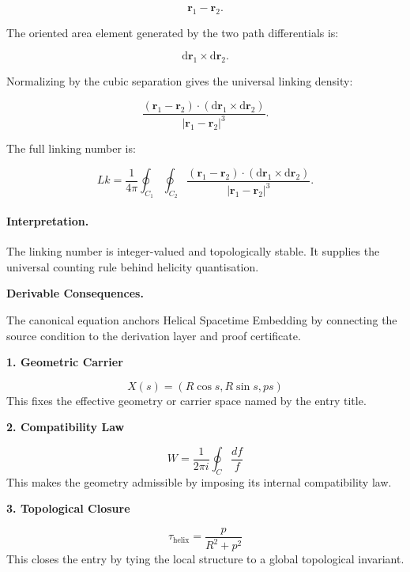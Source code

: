\begin{equation}
\mathbf{r}_1-\mathbf{r}_2 .
\end{equation}

The oriented area element generated by the two path differentials is:

\begin{equation}
\mathrm{d}\mathbf{r}_1\times \mathrm{d}\mathbf{r}_2 .
\end{equation}

Normalizing by the cubic separation gives the universal linking density:

\begin{equation}
\frac{
(\mathbf{r}_1-\mathbf{r}_2)
\cdot
(\mathrm{d}\mathbf{r}_1\times \mathrm{d}\mathbf{r}_2)
}{
|\mathbf{r}_1-\mathbf{r}_2|^3
}.
\end{equation}

The full linking number is:

\begin{equation}
\boxed{
Lk
=
\frac{1}{4\pi}
\oint_{C_1}
\oint_{C_2}
\frac{
(\mathbf{r}_1-\mathbf{r}_2)
\cdot
(\mathrm{d}\mathbf{r}_1\times \mathrm{d}\mathbf{r}_2)
}{
|\mathbf{r}_1-\mathbf{r}_2|^3
}.
}
\end{equation}

\paragraph{Interpretation.}
The linking number is integer-valued and topologically stable. It supplies the universal counting rule behind helicity quantisation.

\par\vspace{0.35em}
\noindent\textbf{Derivable Consequences.}\quad
\begingroup
\footnotesize
\raggedright
The canonical equation anchors Helical Spacetime Embedding by connecting the source condition to the derivation layer and proof certificate.
\par\endgroup

\noindent\textbf{1. Geometric Carrier}\par
\[
X(s)=(R\cos s,R\sin s,ps)
\]
\noindent This fixes the effective geometry or carrier space named by the entry title.\par
\noindent\textbf{2. Compatibility Law}\par
\[
W=\frac{1}{2\pi i}\oint_C\frac{df}{f}
\]
\noindent This makes the geometry admissible by imposing its internal compatibility law.\par
\noindent\textbf{3. Topological Closure}\par
\[
\tau_{\mathrm{helix}}=\frac{p}{R^2+p^2}
\]
\noindent This closes the entry by tying the local structure to a global topological invariant.\par

